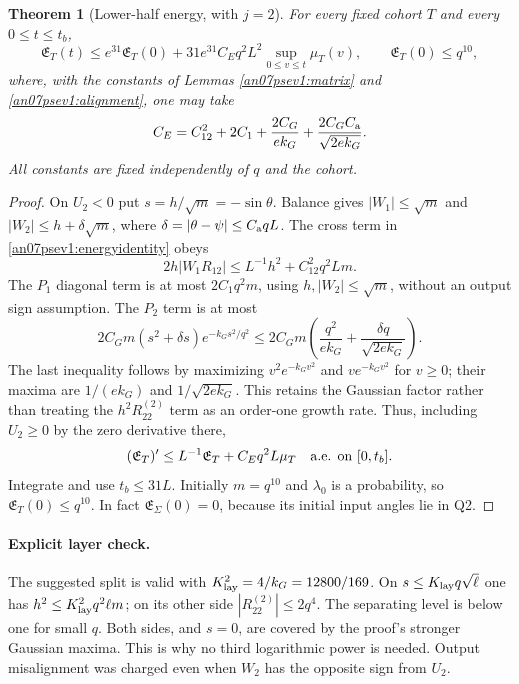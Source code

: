 \documentclass[11pt]{article}
\numberwithin{equation}{section}
\newtheorem{theorem}{Theorem}[section]
\theoremstyle{remark}\newtheorem{remark}[theorem]{Remark}
\newcommand{\EE}{\mathfrak E}
\begin{document}
\begin{theorem}[Lower-half energy, with \(j=2\)]
\label{an07psev1:energy}
For every fixed cohort \(T\) and every \(0\le t\le t_b\),
\begin{equation}
 \EE_T(t)\le e^{31}\EE_T(0)
       +31e^{31}C_Eq^2L^2
                       \sup_{0\le v\le t}\mu_T(v),
 \qquad \EE_T(0)\le q^{10},
 \label{an07psev1:energybound}
\end{equation}
where, with the constants of Lemmas \ref{an07psev1:matrix}
and \ref{an07psev1:alignment}, one may take
\begin{equation}
 C_E=C_{12}^2+2C_1+
              \frac{2C_G}{e k_G}
              +\frac{2C_G C_{\rm a}}{\sqrt{2e k_G}}.
 \label{an07psev1:CE}
\end{equation}
All constants are fixed independently of \(q\) and the cohort.
\end{theorem}
\begin{proof}
On \(U_2<0\) put \(s=h/\sqrt m=-\sin\theta\).
Balance gives \(|W_1|\le\sqrt m\) and
\(|W_2|\le h+\delta\sqrt m\), where
\(\delta=|\theta-\psi|\le C_{\rm a}qL\).
The cross term in \eqref{an07psev1:energyidentity} obeys
\[
 2h|W_1R_{12}|
 \le L^{-1}h^2+C_{12}^2q^2Lm .
 \]
The \(P_1\) diagonal term is at most \(2C_1q^2m\), using
\(h,|W_2|\le\sqrt m\), without an output sign assumption.
The \(P_2\) term is at most
\[
 2C_Gm(s^2+\delta s)e^{-k_Gs^2/q^2}
 \le2C_Gm\left(\frac{q^2}{e k_G}
                 +\frac{\delta q}{\sqrt{2e k_G}}\right).
 \]
The last inequality follows by maximizing
\(v^2e^{-k_Gv^2}\) and \(ve^{-k_Gv^2}\) for \(v\ge0\);
their maxima are \(1/(e k_G)\) and \(1/\sqrt{2e k_G}\).
This retains the Gaussian factor rather than treating
the \(h^2R_{22}^{(2)}\) term as an order-one growth rate.
Thus, including \(U_2\ge0\) by the zero derivative there,
\begin{equation}
 (\EE_T)'\le L^{-1}\EE_T+C_Eq^2L\mu_T
                       \quad\hbox{a.e. on }[0,t_b].
 \label{an07psev1:energydiff}
\end{equation}
Integrate and use \(t_b\le31L\).
Initially \(m=q^{10}\) and \(\lambda_0\) is a probability,
so \(\EE_T(0)\le q^{10}\). In fact \(\EE_\Sigma(0)=0\),
because its initial input angles lie in Q2.
\end{proof}

\paragraph{Explicit layer check.}
The suggested split is valid with
\(K_{\rm lay}^2=4/k_G=12800/169\).
On \(s\le K_{\rm lay}q\sqrt\ell\) one has
\(h^2\le K_{\rm lay}^2q^2\ell m\); on its other side
\(|R_{22}^{(2)}|\le2q^4\).
The separating level is below one for small \(q\).
Both sides, and \(s=0\), are covered by the proof's stronger
Gaussian maxima. This is why no third logarithmic power
is needed. Output misalignment was charged even when
\(W_2\) has the opposite sign from \(U_2\).
\end{document}
